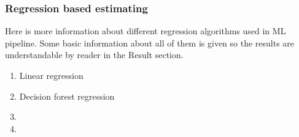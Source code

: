 
\subsubsection*{Regression based estimating}
\begin{itcomment}
    Here is more information about different regression algorithms
    used in ML pipeline.
    Some basic information about all of them is given so the results are understandable
    by reader in the Result section.
\end{itcomment}

\begin{enumerate}
    \item Linear regression
    \item Decision forest regression
    \item \etc
    \item \etc
\end{enumerate}


\clearpage